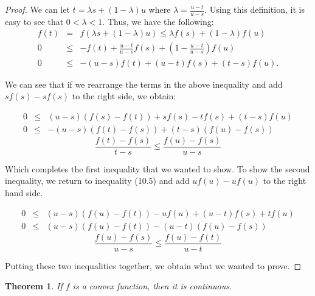 \documentclass[psamsfonts]{amsart}
\newtheorem{thm}{Theorem}[section]
\theoremstyle{definition}
\theoremstyle{remark}
\numberwithin{equation}{section}
\begin{document}
\begin{proof}
We can let $t = \lambda s + (1 - \lambda) u$ where $\lambda = \frac{u-t}{u-s}$. Using this definition, it is easy to see that $0< \lambda < 1$. Thus, we have the following:
\begin{eqnarray}
f(t) &=& f(\lambda s + (1-\lambda)u) \leq \lambda f(s) + (1 - \lambda) f(u) \\
0 &\leq& - f(t) + \frac{u-t}{u-s} f(s) + \left(1 - \frac{u-t}{u-s} \right) f(u) \\
0 &\leq& -(u - s) f(t) + (u - t) f(s) + (t - s) f(u). \label{eq1}
\end{eqnarray}

We can see that if we rearrange the terms in the above inequality and add $ s f(s) - s f(s) $ to the right side, we obtain:

\begin{eqnarray}
0 &\leq& (u - s) (f(s) - f(t)) + s f(s) - t f(s) + (t - s) f(u) \\
0 &\leq& -(u - s) (f(t) - f(s)) + (t - s)( f(u) - f(s))
\end{eqnarray}
\begin{equation}
\frac{f(t) - f(s)}{t-s} \leq \frac{f(u) - f(s)}{u-s} 
\end{equation}

Which completes the first inequality that we wanted to show. To show the second inequality, we return to inequality (10.5) and add $ u f(u) - u f(u)$ to the right hand side.

\begin{eqnarray}
0 &\leq& (u - s)(f(u) - f(t)) - u f(u) + (u - t) f(s) + t f(u) \\
0 &\leq& (u - s)(f(u) - f(t)) - (u - t)(f(u) - f(s))
\end{eqnarray}
\begin{equation}
\frac{f(u) - f(s)}{u - s} \leq \frac{f(u) - f(t)}{u - t}
\end{equation}

Putting these two inequalities together, we obtain what we wanted to prove.
\end{proof}

\begin{thm}
If $f$ is a convex function, then it is continuous.
\end{thm}
\end{document}
